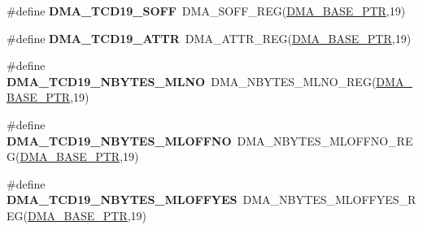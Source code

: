 \begin{DoxyCompactItemize}
\item 
\hypertarget{group___d_m_a___register___accessor___macros_ga38ddcac2cb18879e8b75dc781b7ddc7e}{}\#define {\bfseries D\+M\+A\+\_\+\+T\+C\+D19\+\_\+\+S\+O\+F\+F}~D\+M\+A\+\_\+\+S\+O\+F\+F\+\_\+\+R\+E\+G(\hyperlink{group___d_m_a___peripheral_ga6997fbc1b1973e9f27170217a3bd6f22}{D\+M\+A\+\_\+\+B\+A\+S\+E\+\_\+\+P\+T\+R},19)\label{group___d_m_a___register___accessor___macros_ga38ddcac2cb18879e8b75dc781b7ddc7e}

\item 
\hypertarget{group___d_m_a___register___accessor___macros_ga8c2c004330f09c630018cc9eed828ce1}{}\#define {\bfseries D\+M\+A\+\_\+\+T\+C\+D19\+\_\+\+A\+T\+T\+R}~D\+M\+A\+\_\+\+A\+T\+T\+R\+\_\+\+R\+E\+G(\hyperlink{group___d_m_a___peripheral_ga6997fbc1b1973e9f27170217a3bd6f22}{D\+M\+A\+\_\+\+B\+A\+S\+E\+\_\+\+P\+T\+R},19)\label{group___d_m_a___register___accessor___macros_ga8c2c004330f09c630018cc9eed828ce1}

\item 
\hypertarget{group___d_m_a___register___accessor___macros_gab5d5366463172a613510127fafab289e}{}\#define {\bfseries D\+M\+A\+\_\+\+T\+C\+D19\+\_\+\+N\+B\+Y\+T\+E\+S\+\_\+\+M\+L\+N\+O}~D\+M\+A\+\_\+\+N\+B\+Y\+T\+E\+S\+\_\+\+M\+L\+N\+O\+\_\+\+R\+E\+G(\hyperlink{group___d_m_a___peripheral_ga6997fbc1b1973e9f27170217a3bd6f22}{D\+M\+A\+\_\+\+B\+A\+S\+E\+\_\+\+P\+T\+R},19)\label{group___d_m_a___register___accessor___macros_gab5d5366463172a613510127fafab289e}

\item 
\hypertarget{group___d_m_a___register___accessor___macros_ga9f38c944a4fd96ce23e7f71439afc8bd}{}\#define {\bfseries D\+M\+A\+\_\+\+T\+C\+D19\+\_\+\+N\+B\+Y\+T\+E\+S\+\_\+\+M\+L\+O\+F\+F\+N\+O}~D\+M\+A\+\_\+\+N\+B\+Y\+T\+E\+S\+\_\+\+M\+L\+O\+F\+F\+N\+O\+\_\+\+R\+E\+G(\hyperlink{group___d_m_a___peripheral_ga6997fbc1b1973e9f27170217a3bd6f22}{D\+M\+A\+\_\+\+B\+A\+S\+E\+\_\+\+P\+T\+R},19)\label{group___d_m_a___register___accessor___macros_ga9f38c944a4fd96ce23e7f71439afc8bd}

\item 
\hypertarget{group___d_m_a___register___accessor___macros_ga2af2ff9c75ceac537e9e06f36071381b}{}\#define {\bfseries D\+M\+A\+\_\+\+T\+C\+D19\+\_\+\+N\+B\+Y\+T\+E\+S\+\_\+\+M\+L\+O\+F\+F\+Y\+E\+S}~D\+M\+A\+\_\+\+N\+B\+Y\+T\+E\+S\+\_\+\+M\+L\+O\+F\+F\+Y\+E\+S\+\_\+\+R\+E\+G(\hyperlink{group___d_m_a___peripheral_ga6997fbc1b1973e9f27170217a3bd6f22}{D\+M\+A\+\_\+\+B\+A\+S\+E\+\_\+\+P\+T\+R},19)\label{group___d_m_a___register___accessor___macros_ga2af2ff9c75ceac537e9e06f36071381b}


\end{DoxyCompactItemize}
